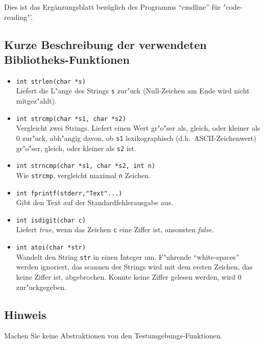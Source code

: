 
Dies ist das Erg\"anzungsblatt bez\"uglich des Programms "`cmdline"'
f\"ur "code-reading"'.

\subsection*{Kurze Beschreibung der verwendeten Bibliotheks-Funktionen}

\begin{itemize}
\item {\tt int strlen(char *s)}\\
	Liefert die L"ange des Strings {\tt s} 
	zur"uck (Null-Zeichen am Ende wird nicht mitgez"ahlt).
\item {\tt int strcmp(char *s1, char *s2)}\\
	Vergleicht zwei Strings. Liefert einen Wert gr"o"ser als, gleich, oder
	kleiner als 0 zur"uck, abh"angig davon, ob {\tt s1} lexikographisch
	(d.h.~ASCII-Zeichenwert) gr"o"ser, gleich, oder 
	kleiner als {\tt s2} ist.	
\item {\tt int strncmp(char *s1, char *s2, int n)}\\
	Wie {\tt strcmp}, vergleicht maximal {\tt n} Zeichen.
\item {\tt int fprintf(stderr,"Text"...)}\\
	Gibt den Text auf der Standardfehlerausgabe aus.
\item {\tt int isdigit(char c)}\\
	Liefert {\em true\/}, wenn das Zeichen {\tt c} eine Ziffer ist,
	ansonsten {\em false\/}.
\item {\tt int atoi(char *str)}\\
	Wandelt den String {\tt str} in einen Integer um. F"uhrende 
	"`white-spaces"' werden ignoriert, das scannen des Strings wird mit dem
	ersten Zeichen, das keine Ziffer ist, abgebrochen. Konnte keine Ziffer
	gelesen werden, wird 0 zur"uckgegeben.
\end{itemize}

\subsection*{Hinweis}

Machen Sie keine Abstraktionen von den Testumgebungs-Funktionen.

